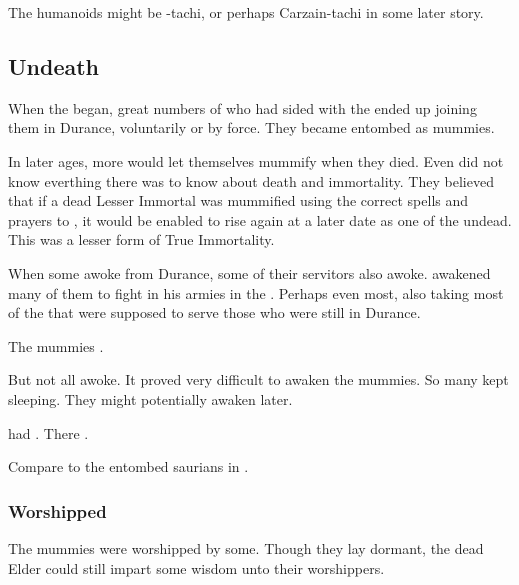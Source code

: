 The humanoids might be \Shilred-tachi, or perhaps Carzain-tachi in some later story. 









\subsection{Undeath}
When the  began, great numbers of \ophidians who had sided with the \dragons ended up joining them in Durance, voluntarily or by force. 
They became entombed as mummies.

In later ages, more \ophidians would let themselves mummify when they died.
Even \Sethicus did not know everthing there was to know about death and immortality. 
They believed that if a dead Lesser Immortal was mummified using the correct spells and prayers to \KhothSell, it would be enabled to rise again at a later date as one of the undead. 
This was a lesser form of True Immortality. 

When some \dragons awoke from Durance, some of their servitors also awoke. 
\Sethicus awakened many of them to fight in his armies in the \firstbanewar. 
Perhaps even most, also taking most of the \ophidians that were supposed to serve those \dragons who were still in Durance. 

The \ophidian mummies .

But not all awoke.
It proved very difficult to awaken the \ophidian mummies. 
So many kept sleeping. 
They might potentially awaken later.

 had . 
There . 

Compare to the entombed saurians in \cite{Nile:InTheirDarkenesShrines}. 





\subsubsection{Worshipped}
The mummies were worshipped by some. 
Though they lay dormant, the dead Elder \ophidians could still impart some wisdom unto their worshippers. 
















